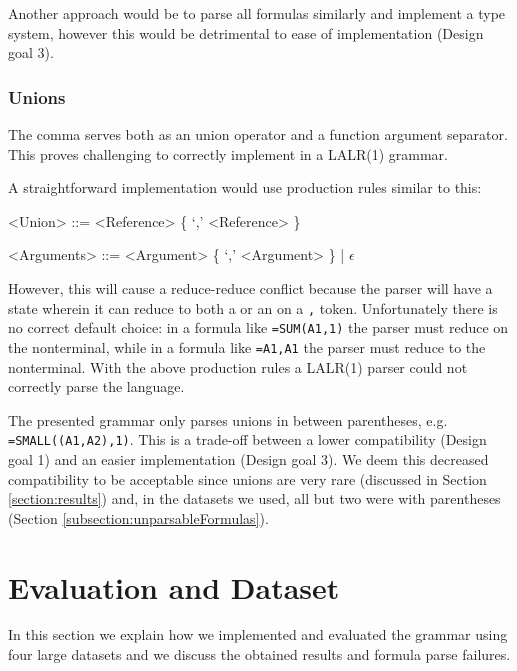 \documentclass[times]{smrauth}
\begin{document}
Another approach would be to parse all formulas similarly and implement a type system, however this would be detrimental to ease of implementation (Design goal 3).

\subsubsection{\textbf{Unions}}
\label{subsec:desing:unions}

The comma serves both as an union operator and a function argument separator.
This proves challenging to correctly implement in a LALR(1) grammar.

A straightforward implementation would use production rules similar to this:
\begin{grammar}
	<Union> ::= <Reference> \{ `,' <Reference> \}

	<Arguments> ::= <Argument> \{ `,' <Argument> \} | $\epsilon$
\end{grammar}

However, this will cause a reduce-reduce conflict because the parser will have a state wherein it can reduce to both a  or an  on a \texttt{,} token.
Unfortunately there is no correct default choice: in a formula like \texttt{=SUM(A1,1)} the parser must reduce on the  nonterminal, while in a formula like \texttt{=A1,A1} the parser must reduce to the  nonterminal.
With the above production rules a LALR(1) parser could not correctly parse the language.

The presented grammar only parses unions in between parentheses, e.g. \texttt{=SMALL((A1,A2),1)}.
This is a trade-off between a lower compatibility (Design goal 1) and an easier implementation (Design goal 3).
We deem this decreased compatibility to be acceptable since unions are very rare (discussed in Section \ref{section:results}) and, in the datasets we used, all but two were with parentheses (Section \ref{subsection:unparsableFormulas}).

\section{Evaluation and Dataset}
\label{sec:evaluation}

In this section we explain how we implemented and evaluated the grammar using four large datasets and we discuss the obtained results and formula parse failures.
\end{document}
